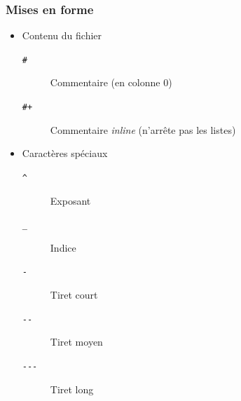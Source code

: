 \documentclass[presentation,t,hideothersubsections]{beamer}
\begin{document}
\begin{frame}
\frametitle{Mises en forme}
\label{sec-2-5-3}


\begin{itemize}
\item Contenu du fichier
\begin{description}
\item[\texttt{\#}] Commentaire (en colonne 0)
\item[\texttt{\#+}] Commentaire \emph{inline} (n'arrête pas les listes)
\end{description}
\item Caractères spéciaux
\begin{description}
\item[\texttt{\textasciicircum{}}] Exposant
\item[\texttt{\_}] Indice
\item[\texttt{-}] Tiret court
\item[\texttt{-{}-}] Tiret moyen
\item[\texttt{-{}-{}-}] Tiret long
\end{description}
\end{itemize}
\end{frame}
\end{document}
